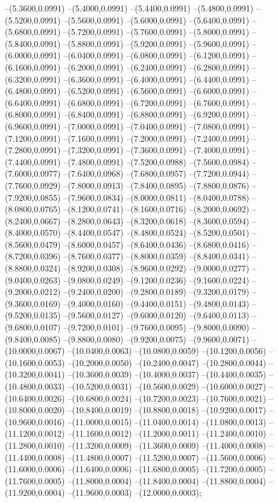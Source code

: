 {	--(5.3600,0.0991)
	--(5.4000,0.0991)
	--(5.4400,0.0991)
	--(5.4800,0.0991)
	--(5.5200,0.0991)
	--(5.5600,0.0991)
	--(5.6000,0.0991)
	--(5.6400,0.0991)
	--(5.6800,0.0991)
	--(5.7200,0.0991)
	--(5.7600,0.0991)
	--(5.8000,0.0991)
	--(5.8400,0.0991)
	--(5.8800,0.0991)
	--(5.9200,0.0991)
	--(5.9600,0.0991)
	--(6.0000,0.0991)
	--(6.0400,0.0991)
	--(6.0800,0.0991)
	--(6.1200,0.0991)
	--(6.1600,0.0991)
	--(6.2000,0.0991)
	--(6.2400,0.0991)
	--(6.2800,0.0991)
	--(6.3200,0.0991)
	--(6.3600,0.0991)
	--(6.4000,0.0991)
	--(6.4400,0.0991)
	--(6.4800,0.0991)
	--(6.5200,0.0991)
	--(6.5600,0.0991)
	--(6.6000,0.0991)
	--(6.6400,0.0991)
	--(6.6800,0.0991)
	--(6.7200,0.0991)
	--(6.7600,0.0991)
	--(6.8000,0.0991)
	--(6.8400,0.0991)
	--(6.8800,0.0991)
	--(6.9200,0.0991)
	--(6.9600,0.0991)
	--(7.0000,0.0991)
	--(7.0400,0.0991)
	--(7.0800,0.0991)
	--(7.1200,0.0991)
	--(7.1600,0.0991)
	--(7.2000,0.0991)
	--(7.2400,0.0991)
	--(7.2800,0.0991)
	--(7.3200,0.0991)
	--(7.3600,0.0991)
	--(7.4000,0.0991)
	--(7.4400,0.0991)
	--(7.4800,0.0991)
	--(7.5200,0.0988)
	--(7.5600,0.0984)
	--(7.6000,0.0977)
	--(7.6400,0.0968)
	--(7.6800,0.0957)
	--(7.7200,0.0944)
	--(7.7600,0.0929)
	--(7.8000,0.0913)
	--(7.8400,0.0895)
	--(7.8800,0.0876)
	--(7.9200,0.0855)
	--(7.9600,0.0834)
	--(8.0000,0.0811)
	--(8.0400,0.0788)
	--(8.0800,0.0765)
	--(8.1200,0.0741)
	--(8.1600,0.0716)
	--(8.2000,0.0692)
	--(8.2400,0.0667)
	--(8.2800,0.0643)
	--(8.3200,0.0618)
	--(8.3600,0.0594)
	--(8.4000,0.0570)
	--(8.4400,0.0547)
	--(8.4800,0.0524)
	--(8.5200,0.0501)
	--(8.5600,0.0479)
	--(8.6000,0.0457)
	--(8.6400,0.0436)
	--(8.6800,0.0416)
	--(8.7200,0.0396)
	--(8.7600,0.0377)
	--(8.8000,0.0359)
	--(8.8400,0.0341)
	--(8.8800,0.0324)
	--(8.9200,0.0308)
	--(8.9600,0.0292)
	--(9.0000,0.0277)
	--(9.0400,0.0263)
	--(9.0800,0.0249)
	--(9.1200,0.0236)
	--(9.1600,0.0224)
	--(9.2000,0.0212)
	--(9.2400,0.0200)
	--(9.2800,0.0189)
	--(9.3200,0.0179)
	--(9.3600,0.0169)
	--(9.4000,0.0160)
	--(9.4400,0.0151)
	--(9.4800,0.0143)
	--(9.5200,0.0135)
	--(9.5600,0.0127)
	--(9.6000,0.0120)
	--(9.6400,0.0113)
	--(9.6800,0.0107)
	--(9.7200,0.0101)
	--(9.7600,0.0095)
	--(9.8000,0.0090)
	--(9.8400,0.0085)
	--(9.8800,0.0080)
	--(9.9200,0.0075)
	--(9.9600,0.0071)
	--(10.0000,0.0067)
	--(10.0400,0.0063)
	--(10.0800,0.0059)
	--(10.1200,0.0056)
	--(10.1600,0.0053)
	--(10.2000,0.0050)
	--(10.2400,0.0047)
	--(10.2800,0.0044)
	--(10.3200,0.0041)
	--(10.3600,0.0039)
	--(10.4000,0.0037)
	--(10.4400,0.0035)
	--(10.4800,0.0033)
	--(10.5200,0.0031)
	--(10.5600,0.0029)
	--(10.6000,0.0027)
	--(10.6400,0.0026)
	--(10.6800,0.0024)
	--(10.7200,0.0023)
	--(10.7600,0.0021)
	--(10.8000,0.0020)
	--(10.8400,0.0019)
	--(10.8800,0.0018)
	--(10.9200,0.0017)
	--(10.9600,0.0016)
	--(11.0000,0.0015)
	--(11.0400,0.0014)
	--(11.0800,0.0013)
	--(11.1200,0.0012)
	--(11.1600,0.0012)
	--(11.2000,0.0011)
	--(11.2400,0.0010)
	--(11.2800,0.0010)
	--(11.3200,0.0009)
	--(11.3600,0.0009)
	--(11.4000,0.0008)
	--(11.4400,0.0008)
	--(11.4800,0.0007)
	--(11.5200,0.0007)
	--(11.5600,0.0006)
	--(11.6000,0.0006)
	--(11.6400,0.0006)
	--(11.6800,0.0005)
	--(11.7200,0.0005)
	--(11.7600,0.0005)
	--(11.8000,0.0004)
	--(11.8400,0.0004)
	--(11.8800,0.0004)
	--(11.9200,0.0004)
	--(11.9600,0.0003)
	--(12.0000,0.0003);
}
